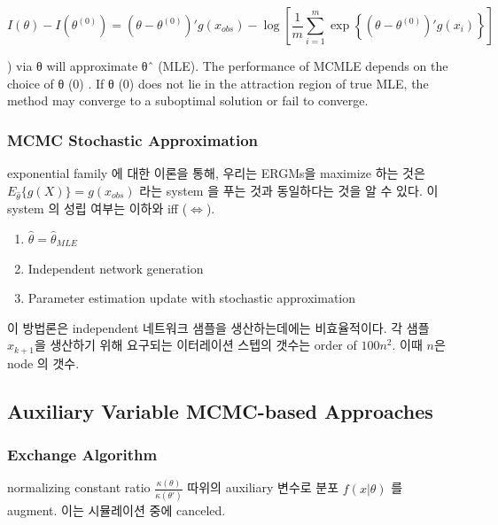 \documentclass[
]{book}
\providecommand{\tightlist}{%
  \setlength{\itemsep}{0pt}\setlength{\parskip}{0pt}}
\begin{document}
{{{\[
I(\theta) - I(\theta^{(0)}) = \left (\theta - \theta^{(0)} \right) ' g(x_{obs}) - \log \left [ \frac{1}{m} \sum_{i=1}^m \exp \left \{ \left (\theta - \theta^{(0)}\right )' g(x_i) \right \} \right ]
\]

) via θ will approximate θˆ (MLE).
The performance of MCMLE depends on the choice of θ
(0)
. If θ
(0)
does
not lie in the attraction region of true MLE, the method may converge to
a suboptimal solution or fail to converge.

\hypertarget{mcmc-stochastic-approximation}{%
\subsubsection{MCMC Stochastic Approximation}\label{mcmc-stochastic-approximation}}

exponential family 에 대한 이론을 통해, 우리는 ERGMs을 maximize 하는 것은 \(E_{\hat \theta} \Big \{ g(X) \Big \} = g(x_{obs})\) 라는 system 을 푸는 것과 동일하다는 것을 알 수 있다. 이 system 의 성립 여부는 이하와 iff (\(\iff\)).

\begin{enumerate}
\def\labelenumi{\arabic{enumi}.}
\tightlist
\item
  \(\hat \theta = \hat \theta_{MLE}\)
\item
  Independent network generation
\item
  Parameter estimation update with stochastic approximation
\end{enumerate}

이 방법론은 independent 네트워크 샘플을 생산하는데에는 비효율적이다. 각 샘플 \(x_{k+1}\)을 생산하기 위해 요구되는 이터레이션 스텝의 갯수는 order of \(100 n^2\). 이때 \(n\)은 node 의 갯수.

\hypertarget{auxiliary-variable-mcmc-based-approaches}{%
\subsection{Auxiliary Variable MCMC-based Approaches}\label{auxiliary-variable-mcmc-based-approaches}}

\hypertarget{exchange-algorithm-2}{%
\subsubsection{Exchange Algorithm}\label{exchange-algorithm-2}}

normalizing constant ratio \(\frac{\kappa(\theta)}{\kappa(\theta')}\) 따위의 auxiliary 변수로 분포 \(f(x | \theta)\) 를 augment. 이는 시뮬레이션 중에 canceled.

}}}
\end{document}
